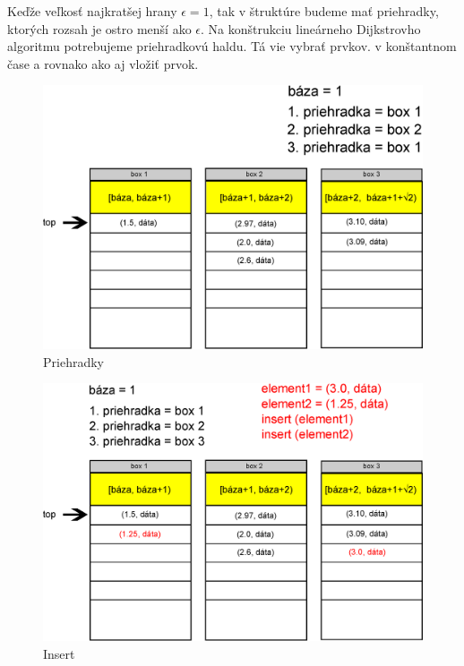 Keďže veľkosť najkratšej hrany $\epsilon = 1$, tak v štruktúre budeme mať priehradky, ktorých rozsah je ostro menší ako $\epsilon$.
Na konštrukciu lineárneho Dijkstrovho algoritmu potrebujeme priehradkovú haldu. Tá vie vybrať   prvkov.
v konštantnom čase a rovnako ako aj vložiť prvok.

\begin{figure}[h]
\includegraphics[width=\textwidth]{./img/priehradky_naplnene_default.eps}
\caption{Priehradky}
\label{fig:priehradky}
\end{figure}


\begin{figure}[h]
\includegraphics[width=\textwidth]{./img/priehradky_naplnene_default_i.eps}
\caption{Insert}
\label{fig:priehradky_i}
\end{figure}

